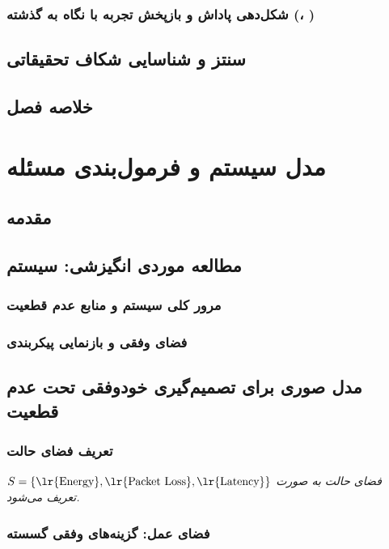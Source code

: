 \documentclass[oneside,openany,phd]{TMU-Thesis}
\begin{document}
\subsection{شکل‌دهی پاداش و بازپخش تجربه با نگاه به گذشته (، )}

\section{سنتز و شناسایی شکاف تحقیقاتی}

\section{خلاصه فصل}

\newpage

\chapter{مدل سیستم و فرمول‌بندی مسئله}
\section{مقدمه}

\section{مطالعه موردی انگیزشی: سیستم }
\subsection{مرور کلی سیستم و منابع عدم قطعیت}
\subsection{فضای وفقی و بازنمایی پیکربندی}

\section{مدل صوری برای تصمیم‌گیری خودوفقی تحت عدم قطعیت}
\subsection{تعریف فضای حالت}
\textit{فضای حالت به صورت $S = \{\text{\lr{Energy}}, \text{\lr{Packet Loss}}, \text{\lr{Latency}}\}$ تعریف می‌شود.}
\subsection{فضای عمل: گزینه‌های وفقی گسسته}
\end{document}
